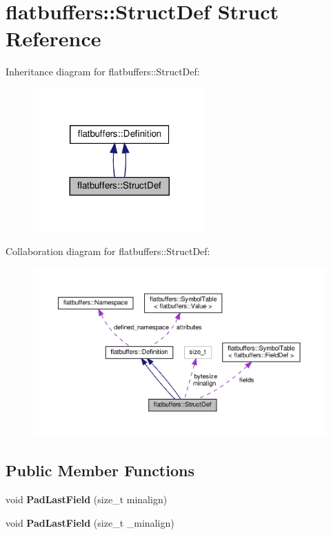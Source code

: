 \hypertarget{structflatbuffers_1_1StructDef}{}\section{flatbuffers\+:\+:Struct\+Def Struct Reference}
\label{structflatbuffers_1_1StructDef}


Inheritance diagram for flatbuffers\+:\+:Struct\+Def\+:
\nopagebreak
\begin{figure}[H]
\begin{center}
\leavevmode
\includegraphics[width=188pt]{structflatbuffers_1_1StructDef__inherit__graph}
\end{center}
\end{figure}


Collaboration diagram for flatbuffers\+:\+:Struct\+Def\+:
\nopagebreak
\begin{figure}[H]
\begin{center}
\leavevmode
\includegraphics[width=350pt]{structflatbuffers_1_1StructDef__coll__graph}
\end{center}
\end{figure}
\subsection*{Public Member Functions}
\begin{DoxyCompactItemize}
\item 
\mbox{\label{structflatbuffers_1_1StructDef_aa16eada17cee747fe19a28fd05fe14d1}} 
void {\bfseries Pad\+Last\+Field} (size\+\_\+t minalign)
\item 
\mbox{\label{structflatbuffers_1_1StructDef_af5d50c2822f89aa63b63a8050ca89396}} 
void {\bfseries Pad\+Last\+Field} (size\+\_\+t \+\_\+minalign)
\end{DoxyCompactItemize}

